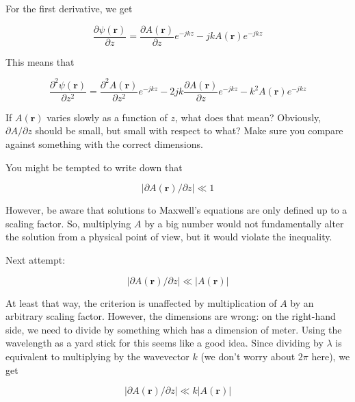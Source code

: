 For the first derivative, we get

\begin{equation}
\frac{\partial \psi({\mathbf r})}{\partial z} = \frac {\partial A({\mathbf r})}{\partial z}e^{-jkz} -j k A({\mathbf r})e^{-jkz}
\end{equation} 

This means that

\begin{equation}
  \frac{\partial^2 \psi({\mathbf r})}{\partial z^2} = \frac{\partial^2 A({\mathbf r})}{\partial z^2}e^{-jkz} - 2 j k \frac{\partial A({\mathbf r})}{\partial z}e^{-jkz} - k^2 A({\mathbf r})e^{-jkz}
 \label{eq-svea-d2} 
\end{equation} 

\begin{cue}
If $A({\mathbf r})$ varies slowly as a function of $z$, what does that mean? Obviously, $\partial A / \partial z$ should be small, but small with respect to what? Make sure you compare against something with the correct dimensions.
\end{cue}

You might be tempted to write down that

\begin{equation}
  \left|\partial A({\mathbf r}) / \partial z\right| \ll 1
 \end{equation}

However, be aware that solutions to Maxwell's equations are only defined up to a scaling factor. So, multiplying $A$ by a big number would not fundamentally alter the solution from a physical point of view, but it would violate the inequality.

Next attempt:

\begin{equation}
 \left|\partial A({\mathbf r}) / \partial z\right| \ll \left|A({\mathbf r})\right|
\end{equation} 

At least that way, the criterion is unaffected by multiplication of $A$ by an arbitrary scaling factor. However, the dimensions are wrong: on the right-hand side, we need to divide by something which has a dimension of meter. Using the wavelength as a yard stick for this seems like a good idea. Since dividing by $\lambda$ is equivalent to multiplying by the wavevector $k$ (we don't worry about $2 \pi$ here), we get

\begin{equation}
\left|\partial A({\mathbf r}) / \partial z\right| \ll k \left|A({\mathbf r})\right| \label{eq-approx-paraxial-1}
\end{equation}

